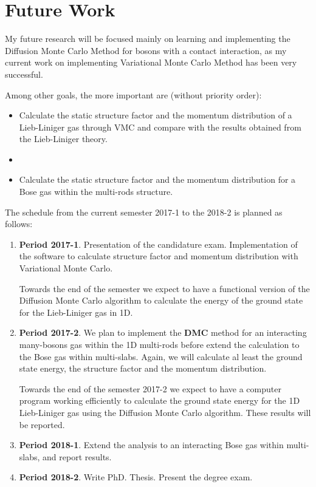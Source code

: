 \chapter{Future Work}

My future research will be focused mainly on learning and implementing the
Diffusion Monte Carlo Method for bosons with a contact interaction, as my
current work on implementing Variational Monte Carlo Method has been very
successful.

Among other goals, the more important are (without priority order):

\begin{itemize}
  \item Calculate the static structure factor and the momentum distribution of a
        Lieb-Liniger gas through VMC and compare with the results obtained from
        the Lieb-Liniger theory.
  \item
  \item Calculate the static structure factor and the momentum distribution for
        a Bose gas within the multi-rods structure.
\end{itemize}


The schedule from the current semester 2017-1 to the 2018-2 is planned as
follows:

\begin{enumerate}
  \item \textbf{Period 2017-1}. Presentation of the candidature exam.
        Implementation of the software to calculate structure factor and
        momentum distribution with Variational Monte Carlo.

        Towards the end of the semester we expect to have a functional version
        of the Diffusion Monte Carlo algorithm to calculate the energy of the
        ground state for the Lieb-Liniger gas in 1D.

  \item \textbf{Period 2017-2}. We plan to implement the \textbf{DMC} method for
        an interacting many-bosons gas within the 1D multi-rods before extend
        the calculation to the Bose gas within multi-slabs. Again, we will
        calculate al least the ground state energy, the structure factor and the
        momentum distribution.

        Towards the end of the semester 2017-2 we expect to have a computer
        program working efficiently to calculate the ground state energy for the
        1D Lieb-Liniger gas using the Diffusion Monte Carlo algorithm. These
        results will be reported.

  \item \textbf{Period 2018-1}. Extend the analysis to an interacting Bose gas
        within multi-slabs, and report results.

  \item \textbf{Period 2018-2}. Write PhD. Thesis. Present the degree exam.
\end{enumerate}

